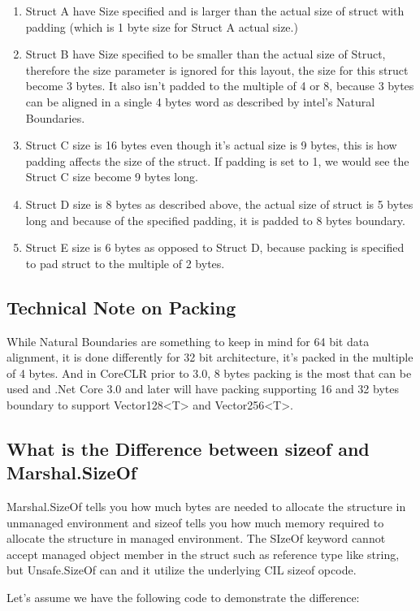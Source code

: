 \begin{enumerate}
	\item Struct A have Size specified and is larger than the actual size of struct with padding (which is 1 byte size for Struct A actual size.)
	\item Struct B have Size specified to be smaller than the actual size of Struct, therefore the size parameter is ignored for this layout, the size for this struct become 3 bytes. It also isn't padded to the multiple of 4 or 8, because 3 bytes can be aligned in a single 4 bytes word as described by intel's Natural Boundaries.
	\item Struct C size is 16 bytes even though it's actual size is 9 bytes, this is how padding affects the size of the struct. If padding is set to 1, we would see the Struct C size become 9 bytes long.
	\item Struct D size is 8 bytes as described above, the actual size of struct is 5 bytes long and because of the specified padding, it is padded to 8 bytes boundary.
	\item Struct E size is 6 bytes as opposed to Struct D, because packing is specified to pad struct to the multiple of 2 bytes.
\end{enumerate}

\subsection{Technical Note on Packing}
While Natural Boundaries are something to keep in mind for 64 bit data alignment, it is done differently for 32 bit architecture, it's packed in the multiple of 4 bytes. And in CoreCLR prior to 3.0, 8 bytes packing is the most that can be used and .Net Core 3.0 and later will have packing supporting 16 and 32 bytes boundary to support Vector128<T> and Vector256<T>. 

\subsection{What is the Difference between sizeof and Marshal.SizeOf}
Marshal.SizeOf tells you how much bytes are needed to allocate the structure in unmanaged environment and sizeof tells you how much memory required to allocate the structure in managed environment. The SIzeOf keyword cannot accept managed object member in the struct such as reference type like string, but Unsafe.SizeOf can and it utilize the underlying CIL sizeof opcode.

Let's assume we have the following code to demonstrate the difference:

